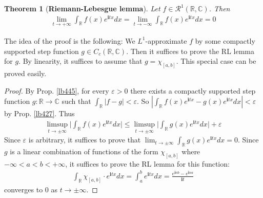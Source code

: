 \documentclass[12pt,b5paper,notitlepage]{article}
\theoremstyle{definition}
\newtheorem{rem}[df]{Remark}
\theoremstyle{plain}
\newtheorem{thm}[df]{Theorem}
\newcommand{\scr}{\mathscr}
\newcommand{\im}{\mathbf{i}}
\newcommand{\Cbb}{\mathbb C}
\newcommand{\Rbb}{\mathbb R}
\newcommand{\eps}{\varepsilon}
\numberwithin{equation}{section}
\begin{document}
\begin{thm}[\textbf{Riemann-Lebesgue lemma}] 
Let $f\in\scr R^1(\Rbb,\Cbb)$. Then
\begin{align*}
\lim_{t\rightarrow+\infty}\int_\Rbb f(x)e^{\im tx}dx=\lim_{t\rightarrow-\infty}\int_\Rbb f(x)e^{\im tx}dx=0
\end{align*}
\end{thm}

The idea of the proof is the following: We $L^1$-approximate $f$ by some compactly supported step function $g\in C_c(\Rbb,\Cbb)$. Then it suffices to prove the RL lemma for $g$. By linearity, it suffices to assume that $g=\chi_{[a,b]}$. This special case can be proved easily. 

\begin{proof}
By Prop. \ref{lb445}, for every $\eps>0$ there exists a compactly supported step function $g:\Rbb\rightarrow\Cbb$ such that  $\int_\Rbb|f-g|<\eps$. So $|\int_\Rbb f(x)e^{\im tx}-g(x)e^{\im tx}dx|<\eps$ by Prop. \ref{lb427}. Thus
\begin{align*}
\limsup_{t\rightarrow\pm\infty} \Big| \int_\Rbb f(x)e^{\im tx}dx\Big|\leq \limsup_{t\rightarrow\pm\infty} \Big|\int_\Rbb g(x)e^{\im tx}dx\Big|+\eps
\end{align*}
Since $\eps$ is arbitrary, it suffices to prove that $\lim_{t\rightarrow\pm\infty}\int_\Rbb g(x)e^{\im tx}dx=0$. Since $g$ is a linear combination of functions of the form $\chi_{[a,b]}$ where $-\infty<a<b<+\infty$, it suffices to prove the RL lemma for this function:
\begin{align*}
\int_\Rbb\chi_{[a,b]}\cdot e^{\im tx}dx=\int_a^b e^{\im tx}dx=\frac{e^{\im nb}-e^{\im na}}{\im t}
\end{align*}
converges to $0$ as $t\rightarrow\pm\infty$.
\end{proof}

\begin{comment}
\begin{rem}
The proof of Prop. \ref{lb445} also shows that $f\in\scr R^1(\Rbb,\Cbb)$ can be approximated by linear combinations of functions of the form $\chi_J$ (where $J$ is an interval) under the $L^1$-norm. Thus, the Riemann-Lebesgue lemma can also be proved by showing that $\lim_{t\rightarrow\pm\infty}\int_\Rbb \chi_J(x)e^{\im tx}dx=0$. For such a proof one does not need SW theorem. However, in the general measure theory, it is often more convenient to approximate an integrable function by continuous compactly supported ones. For example, if a function is defined on a manifold (e.g., a sphere, or a more complicated geometric object), it is not easy to approximate such a function by a linear combination of $\chi_E$ where $E$ is a set as simple as an interval. 
\end{rem}
\end{comment}
\end{document}

